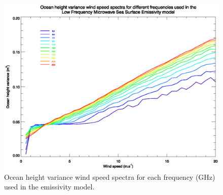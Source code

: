 \begin{figure}[htp]
  \centering
  \includegraphics[scale=0.8]{graphics/LUT/sdd_wind_speed_spectra.eps}
  \caption{Ocean height variance wind speed spectra for each frequency (GHz) used in the emissivity model.}
  \label{fig:sdd_wind_speed_spectra}
\end{figure}

